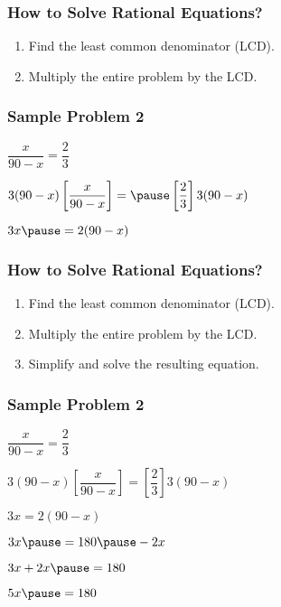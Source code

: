 \documentclass[14pt]{beamer}
\begin{document}
    \begin{frame}
    	\frametitle{How to Solve Rational Equations?}
    	\begin{enumerate}
    		\item Find the least common denominator (LCD).
    		\item Multiply the entire problem by the LCD.
    	\end{enumerate}
    \end{frame}

    \begin{frame}
    	\frametitle{Sample Problem 2}
    	$ \dfrac{x}{90 - x} = \dfrac{2}{3} $
    	
    	\pause \vone $ 3(90-x)\left[ \dfrac{x}{90 - x} \right] = \pause \left[\dfrac{2}{3} \right] 3(90-x) $
    	
    	\pause \vone $ 3x \pause = 2(90 - x) $
    \end{frame}

    \begin{frame}
    	\frametitle{How to Solve Rational Equations?}
    	\begin{enumerate}
    		\item Find the least common denominator (LCD).
    		\item Multiply the entire problem by the LCD.
    		\item Simplify and solve the resulting equation.
    	\end{enumerate}
    \end{frame}

    \begin{frame}
    	\frametitle{Sample Problem 2}
    	$ \dfrac{x}{90 - x} = \dfrac{2}{3} $
    	
    	\vone $ 3(90-x)\left[ \dfrac{x}{90 - x} \right] =  \left[\dfrac{2}{3} \right] 3(90-x) $
    	
    	\vspace{0.5em} $ 3x  = 2(90 - x) $
    	
    	\pause \vspace{0.5em} $ 3x  \pause = 180 \pause - 2x $
    	
    	\pause \vspace{0.5em} $ 3x + 2x  \pause = 180 $
    	
    	\pause \vone $ 5x  \pause = 180 $
    \end{frame}
\end{document}
